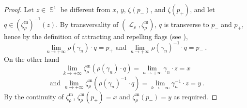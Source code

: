 \documentclass{amsart}
\theoremstyle{plain}
\theoremstyle{definition}
\DeclareMathOperator{\Lc}{\mathcal{L}}
\DeclareMathOperator{\Sb}{\mathbb{S}}
\newcommand{\1}{\mathbf{1}}
\begin{document}
\begin{proof}
Let $z\in \Sb^1$ be different from $x$, $y$, $\zeta(p_-)$, and $\zeta(p_+)$, and let $q \in {(\zeta_\rho^{\mathrm{m}})}^{-1}(z)$. By transversality of $(\Lc_\rho, \zeta_\rho^{\mathrm{m}})$, $q$ is transverse to $p_-$ and $p_+$, hence by the definition of attracting and repelling flags (see ),
\[\lim_{n\to +\infty}\rho(\gamma_n)\cdot q = p_+ \textrm{ and } \lim_{n\to +\infty}\rho(\gamma_n)^{-1}\cdot q = p_-~.\]
On the other hand
\[\lim_{k\to +\infty} \zeta_\rho^{\mathrm{m}}(\rho(\gamma_n)\cdot q) = \lim_{n\to +\infty} \gamma_n\cdot z = x \]\[\textrm{ and } \lim_{n\to +\infty} \zeta_\rho^{\mathrm{m}}(\rho(\gamma_n)^{-1}\cdot q) = \lim_{k\to +\infty} \gamma_n^{-1}\cdot z = y~.\]
By the continuity of $\zeta_\rho^{\mathrm{m}}$, $\zeta_\rho^{\mathrm{m}}(p_+) = x$ and $\zeta_\rho^{\mathrm{m}}(p_-) = y$ as required.
\end{proof}
\end{document}
